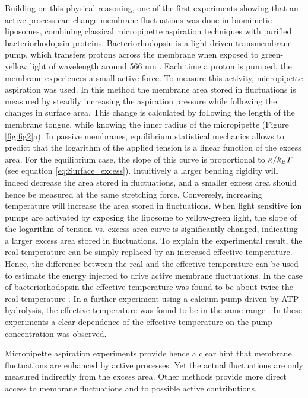 \documentclass[graybox]{svmult}
\begin{document}
Building on this physical reasoning, one of the first experiments showing that an active process can change membrane fluctuations was done in biomimetic liposomes, combining classical micropipette aspiration techniques with purified bacteriorhodopsin proteins. Bacteriorhodopsin is a light-driven transmembrane pump, which transfers protons across the membrane when exposed to green-yellow light of wavelength around 566 nm \cite{Wickstrand:2015}. Each time a proton is pumped, the membrane experiences a small active force. To measure this activity, micropipette aspiration was used. In this method the membrane area stored in fluctuations is measured by steadily increasing the aspiration pressure while following the changes in surface area. This change is calculated by following the length of the membrane tongue, while knowing the inner radius of the micropipette (Figure \ref{fig:fig2}a). In passive membranes, equilibrium statistical mechanics allows to predict that the logarithm of the applied tension is a linear function of the excess area. For the equilibrium case, the slope of this curve is proportional to $\kappa/k_{\rm{B}}T$ (see equation \eqref{eq:Surface_excess}). Intuitively a larger bending rigidity will indeed decrease the area stored in fluctuations, and a smaller excess area should hence be measured at the same stretching force. Conversely, increasing temperature will increase the area stored in fluctuations. When light sensitive ion pumps are activated by exposing the liposome to yellow-green light, the slope of the logarithm of tension vs. excess area curve is significantly changed, indicating a larger excess area stored in fluctuations. To explain the experimental result, the real temperature can be simply replaced by an increased effective temperature. Hence, the difference between the real and the effective temperature can be used to estimate the energy injected to drive active membrane fluctuations. In the case of bacteriorhodopsin the effective temperature was found to be about twice the real temperature \cite{Manneville:2001}. In a further experiment using a calcium pump driven by ATP hydrolysis, the effective temperature was found to be in the same range \cite{Girard:2005}. In these experiments a clear dependence of the effective temperature on the pump concentration was observed. 

Micropipette aspiration experiments provide hence a clear hint that membrane fluctuations are enhanced by active processes. Yet the actual fluctuations are only measured indirectly from the excess area. Other methods provide more direct access to membrane fluctuations and to possible active contributions. 
\end{document}
